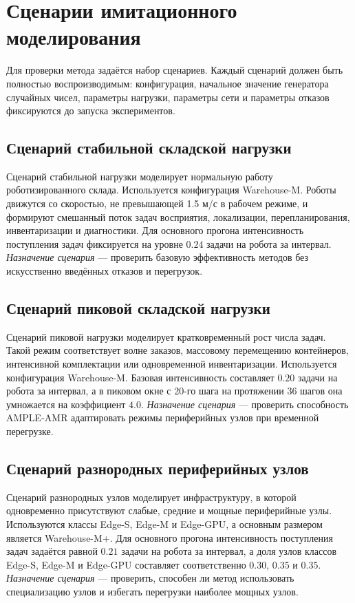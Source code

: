 \section{Сценарии имитационного моделирования}

Для проверки метода задаётся набор сценариев. Каждый сценарий должен быть полностью воспроизводимым: конфигурация, начальное значение генератора случайных чисел, параметры нагрузки, параметры сети и параметры отказов фиксируются до запуска экспериментов.

\subsection{Сценарий стабильной складской нагрузки}

Сценарий стабильной нагрузки моделирует нормальную работу роботизированного склада. Используется конфигурация Warehouse-M. Роботы движутся со скоростью, не превышающей 1.5 м/с в рабочем режиме, и формируют смешанный поток задач восприятия, локализации, перепланирования, инвентаризации и диагностики. Для основного прогона интенсивность поступления задач фиксируется на уровне $0.24$ задачи на робота за интервал. \textit{Назначение сценария} --- проверить базовую эффективность методов без искусственно введённых отказов и перегрузок.

\subsection{Сценарий пиковой складской нагрузки}

Сценарий пиковой нагрузки моделирует кратковременный рост числа задач. Такой режим соответствует волне заказов, массовому перемещению контейнеров, интенсивной комплектации или одновременной инвентаризации. Используется конфигурация Warehouse-M. Базовая интенсивность составляет $0.20$ задачи на робота за интервал, а в пиковом окне с 20-го шага на протяжении 36 шагов она умножается на коэффициент $4.0$. \textit{Назначение сценария} --- проверить способность AMPLE-AMR адаптировать режимы периферийных узлов при временной перегрузке.

\subsection{Сценарий разнородных периферийных узлов}

Сценарий разнородных узлов моделирует инфраструктуру, в которой одновременно присутствуют слабые, средние и мощные периферийные узлы. Используются классы Edge-S, Edge-M и Edge-GPU, а основным размером является Warehouse-M+. Для основного прогона интенсивность поступления задач задаётся равной $0.21$ задачи на робота за интервал, а доля узлов классов Edge-S, Edge-M и Edge-GPU составляет соответственно $0.30$, $0.35$ и $0.35$. \textit{Назначение сценария} --- проверить, способен ли метод использовать специализацию узлов и избегать перегрузки наиболее мощных узлов.

